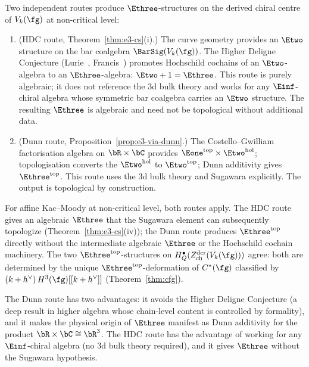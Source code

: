 \begin{remark}
\label{rem:e3-two-routes}%
%
Two independent routes produce $\Ethree$-structures on the derived
chiral centre of $V_k(\fg)$ at non-critical level:
\begin{enumerate}[label=\textup{(\alph*)}]
\item \textup{(HDC route, Theorem~\textup{\ref{thm:e3-cs}(i)}.)}
 The curve geometry provides an $\Etwo$ structure on the bar
 coalgebra $\BarSig(V_k(\fg))$. The Higher Deligne Conjecture
 (Lurie~\cite{HA}, Francis~\cite{Francis2013}) promotes
 Hochschild cochains of an $\Etwo$-algebra to an
 $\Ethree$-algebra: $\Etwo + 1 = \Ethree$. This route is
 purely algebraic; it does not reference the $3$d bulk theory
 and works for any $\Einf$-chiral algebra whose symmetric bar
 coalgebra carries an $\Etwo$ structure. The resulting
 $\Ethree$ is algebraic and need not be topological without
 additional data.

\item \textup{(Dunn route, Proposition~\textup{\ref{prop:e3-via-dunn}}.)}
 The Costello--Gwilliam factorisation algebra on $\bR \times \bC$
 provides $\Eone^{\mathrm{top}} \times \Etwo^{\mathrm{hol}}$;
 topologisation converts the $\Etwo^{\mathrm{hol}}$ to
 $\Etwo^{\mathrm{top}}$; Dunn additivity gives
 $\Ethree^{\mathrm{top}}$. This route uses the $3$d
 bulk theory and Sugawara explicitly. The output is topological
 by construction.
\end{enumerate}
For affine Kac--Moody at non-critical level, both routes apply.
The HDC route gives an algebraic $\Ethree$ that the Sugawara
element can subsequently topologize
(Theorem~\ref{thm:e3-cs}(iv)); the Dunn route produces
$\Ethree^{\mathrm{top}}$ directly without the intermediate
algebraic $\Ethree$ or the Hochschild cochain machinery. The
two $\Ethree^{\mathrm{top}}$-structures on
$H_Q^\bullet(Z^{\mathrm{der}}_{\mathrm{ch}}(V_k(\fg)))$ agree:
both are determined by the unique
$\Ethree^{\mathrm{top}}$-deformation of $C^*(\fg)$
classified by $(k + h^\vee)\,H^3(\fg)[[k+h^\vee]]$
(Theorem~\ref{thm:cfg}).

The Dunn route has two advantages: it avoids the Higher Deligne
Conjecture (a deep result in higher algebra whose chain-level
content is controlled by formality), and it makes the physical
origin of $\Ethree$ manifest as Dunn additivity for the product
$\bR \times \bC \cong \bR^3$. The HDC route has the advantage
of working for any $\Einf$-chiral algebra (no $3$d bulk theory
required), and it gives $\Ethree$ without the Sugawara hypothesis.


\end{remark}
